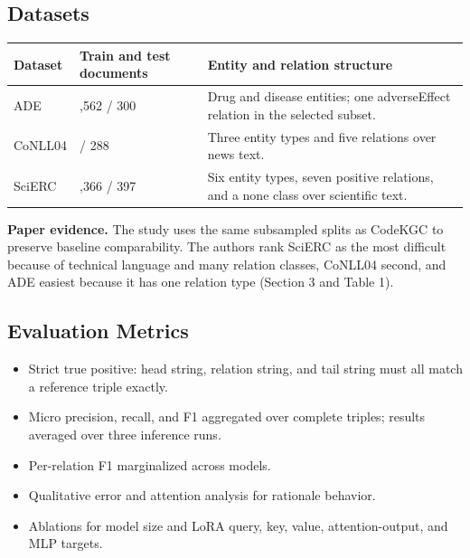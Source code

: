 \documentclass[11pt]{article}
\newcounter{none} %
\begin{document}
\subsection{Datasets}\label{datasets-2}

{\def\LTcaptype{none} %
\begin{longtable}[]{@{}
  >{\raggedright\arraybackslash}p{}
  >{\raggedright\arraybackslash}p{}
  >{\raggedright\arraybackslash}p{}@{}}
\toprule\noalign{}
\begin{minipage}[b]{\linewidth}\centering
\textbf{Dataset}
\end{minipage} & \begin{minipage}[b]{\linewidth}\centering
\textbf{Train and test documents}
\end{minipage} & \begin{minipage}[b]{\linewidth}\centering
\textbf{Entity and relation structure}
\end{minipage} \\
\midrule\noalign{}
\endhead
\bottomrule\noalign{}
\endlastfoot
ADE & 2,562 / 300 & Drug and disease entities; one adverseEffect
relation in the selected subset. \\
CoNLL04 & 922 / 288 & Three entity types and five relations over news
text. \\
SciERC & 1,366 / 397 & Six entity types, seven positive relations, and a
none class over scientific text. \\
\end{longtable}
}

\textbf{Paper evidence.} The study uses the same subsampled splits as CodeKGC to
preserve baseline comparability. The authors rank SciERC as the most
difficult because of technical language and many relation classes,
CoNLL04 second, and ADE easiest because it has one relation type
(Section 3 and Table 1).

\subsection{Evaluation Metrics}\label{evaluation-metrics-3}

\begin{itemize}
\item
  Strict true positive: head string, relation string, and tail string
  must all match a reference triple exactly.
\item
  Micro precision, recall, and F1 aggregated over complete triples;
  results averaged over three inference runs.
\item
  Per-relation F1 marginalized across models.
\item
  Qualitative error and attention analysis for rationale behavior.
\item
  Ablations for model size and LoRA query, key, value, attention-output,
  and MLP targets.
\end{itemize}
\end{document}
